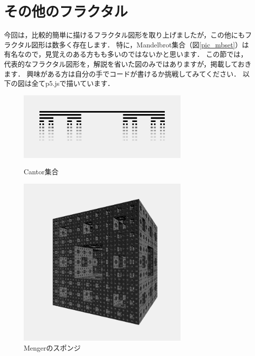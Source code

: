 \documentclass[dvipdfmx]{jsarticle}
\theoremstyle{definition}
\begin{document}
\section{その他のフラクタル}  \label{sec_other_fractal}
今回は，比較的簡単に描けるフラクタル図形を取り上げましたが，この他にもフラクタル図形は数多く存在します．
特に，Mandelbrot集合（図\ref{pic_mbset}）は有名なので，見覚えのある方もも多いのではないかと思います．
この節では，代表的なフラクタル図形を，解説を省いた図のみではありますが，掲載しておきます．
興味がある方は自分の手でコードが書けるか挑戦してみてください．
以下の図は全てp5.jsで描いています．
\vspace{\baselineskip}

\begin{figure}[H]
    \begin{minipage}{0.49\hsize}
        \centering
        \includegraphics[width=0.75\textwidth]{figure/others/relatives/cantor_set.png}
        \caption{Cantor集合}
        \label{pic_cantorset}
    \end{minipage}
    \begin{minipage}{0.49\hsize}
        \centering
        \includegraphics[width=0.75\textwidth]{figure/others/relatives/sponge.png}
        \caption{Mengerのスポンジ}
        \label{pic_menger_sponge}
    \end{minipage}
\end{figure}
\end{document}
